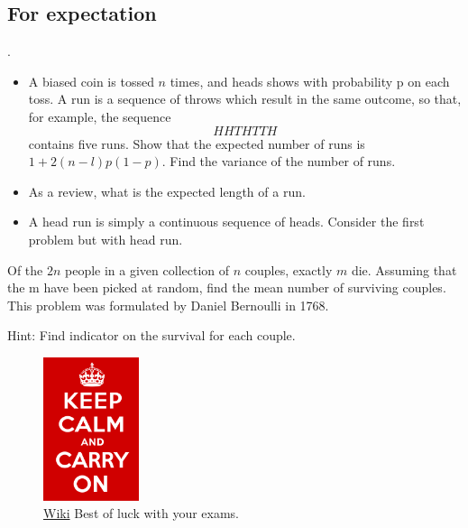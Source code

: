\subsection{For expectation}
\begin{eg}.\\
   \begin{itemize}
       \item A biased coin is tossed \(n\)  times, and heads shows with probability p on each toss. A run is a
sequence of throws which result in the same outcome, so that, for example, the sequence 
\[
HHTHTTH
\]    
contains five runs. Show that the expected number of runs is \(1 + 2(n - l)p(1 - p) \). Find the variance
of the number of runs. 
        \item As a review, what is the expected length of a run. 
        \item A head run is simply a continuous sequence of heads. Consider the first problem but with head run.
   \end{itemize} 
\end{eg}
\begin{exercise}
    Of the \(2n\)  people in a given collection of \(n\)  couples, exactly \(m\)  die. Assuming that the m have
been picked at random, find the mean number of surviving couples. This problem was formulated by
Daniel Bernoulli in 1768.\\
\end{exercise}
Hint: Find indicator on the survival for each couple.
\begin{figure}[hbt]
    \centering
    \includegraphics[width=0.25\textwidth]{./Figures/Keep_Calm_and_Carry_On.png}
    \caption*{\href{https://commons.wikimedia.org/wiki/File:Keep_Calm_and_Carry_On_Poster.svg}{Wiki} Best of luck with your exams.}
\end{figure}